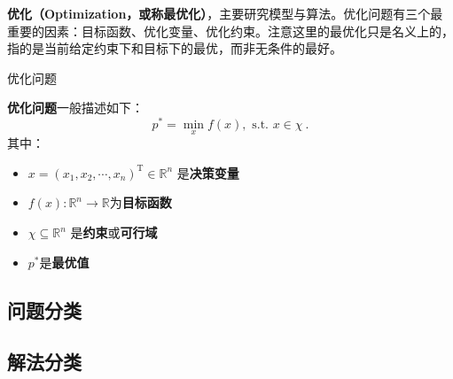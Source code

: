 
\begin{issues}
\issueDraft
\end{issues}


\textbf{优化（Optimization，或称最优化）}，主要研究模型与算法。优化问题有三个最重要的因素：目标函数、优化变量、优化约束。注意这里的最优化只是名义上的，指的是当前给定约束下和目标下的最优，而非无条件的最好。

\begin{definition}{优化问题}

\textbf{优化问题}一般描述如下：
\begin{equation}
p^*=\min _x f(x),\text{ s.t. } x\in \chi ~.
\end{equation}
其中：
\begin{itemize}
\item $x=(x_1,x_2,\cdots,x_n)^\text{T}\in\mathbb{R}^n$ 是\textbf{决策变量}
\item $f(x):\mathbb{R}^n\rightarrow\mathbb{R}$为\textbf{目标函数}
\item $\chi\subseteq\mathbb{R}^n$ 是\textbf{约束}或\textbf{可行域}
\item $p^*$是\textbf{最优值}
\end{itemize}
\end{definition}

\subsection{问题分类}

\subsection{解法分类}